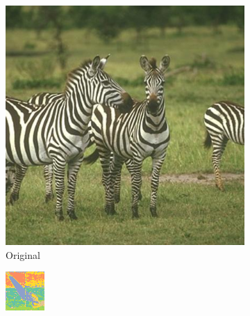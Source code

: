 \documentclass[11pt,a4paper]{article}
\begin{document}
\begin{figure}
\begin{subfigure}[b]{0.3\textwidth}
        \includegraphics[width=\textwidth]{figures/dino/tile_2/253027.jpg}
        \caption{Original}
    \end{subfigure}
    \hfill
    \begin{subfigure}[b]{0.3\textwidth}
        \centering
        \includegraphics[width=\textwidth]{figures/dino/tile_2/62096_seg.png}

\end{subfigure}
\end{figure}
\end{document}
